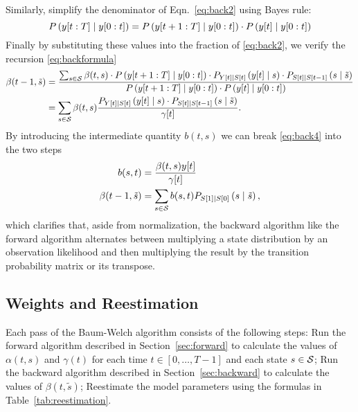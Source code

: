 Similarly, simplify the denominator of Eqn.~\eqref{eq:back2} using
Bayes rule:
\begin{equation*}
  P \left(y[t:T]\mid y[0:t] \right) = P
  \left(y[t+1:T]\mid y[0:t]  \right) \cdot {P \left(
  {y}{[t]}\mid y[0:t]\right)}
\end{equation*}
Finally by substituting these values into the fraction of
\eqref{eq:back2}, we verify the recursion \eqref{eq:backformula}
\begin{align}
  \mlabel{eq:back3} \beta(t-1,{\tilde s}) &= \frac{\sum_{s\in\states}
    \beta(t,s) \cdot P \left(\ts{y}{t+1}{T}\given \ts{y}{0}{t} \right)
    \cdot P_{\ti{Y}{t}\given \ti{S}{t}} \left(\ti{y}{t}\given s \right) \cdot
    P_{\ti{S}{t}\given \ti{S}{t-1}} \left(s\given {\tilde s} \right)} {P
    \left(\ts{y}{t+1}{T}\given \ts{y}{0}{t} \right) \cdot {P \left(
        \ti{y}{t}\given \ts{y}{0}{t}\right)}} \\
  \mlabel{eq:back4} &= \sum_{s\in\states} \beta(t,s) \frac{
    P_{\ti{Y}{t}\given \ti{S}{t}} \left(\ti{y}{t}\given s \right) \cdot
    P_{\ti{S}{t}\given \ti{S}{t-1}} \left(s\given {\tilde s} \right)} {\ti{\gamma}{t}}.
\end{align}
By introducing the intermediate quantity $b(t,s)$ we can break
\eqref{eq:back4} into the two steps
\begin{subequations}
  \label{eq:2LineBackward}
  \begin{align}
    \mlabel{eq:back5}
    b(s,t) &= \frac{\beta(t,s) \ti{y}{t}}{\ti{\gamma}{t}} \\
    \mlabel{eq:back6}
    \beta(t-1,\tilde s) &= \sum_{s\in\states} b(s,t) P_{\ti{S}{1}\given
                          \ti{S}{0}} \left(s\given {\tilde s} \right),
  \end{align}
\end{subequations}
which clarifies that, aside from normalization, the backward algorithm
like the forward algorithm alternates between multiplying a state
distribution by an observation likelihood and then multiplying the
result by the transition probability matrix or its transpose.

\subsection{Weights and Reestimation}
\label{sec:reestimation}

Each pass of the Baum-Welch algorithm consists of the following steps:
Run the forward algorithm described in Section~\ref{sec:forward} to
calculate the values of $\alpha(t,s)$ and $\gamma(t)$ for each time $t
\in [0,\ldots,T-1]$ and each state $s \in \states$; Run the backward
algorithm described in Section~\ref{sec:backward} to calculate the
values of $\beta(t,{\tilde s})$; Reestimate the model parameters using the
formulas in Table~\ref{tab:reestimation}.

